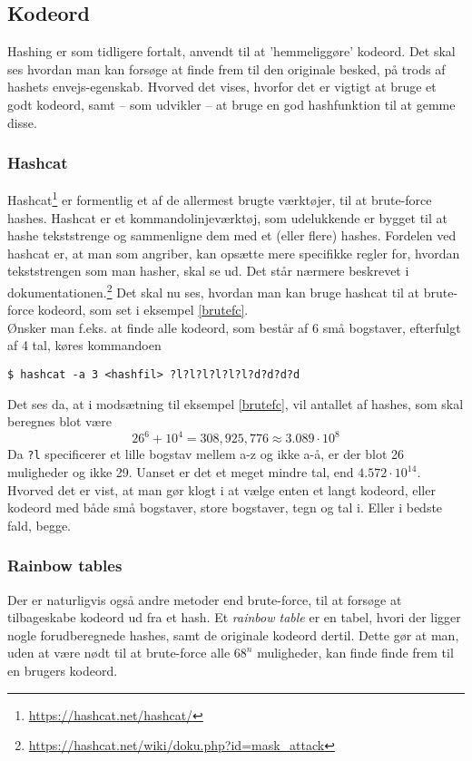 \subsection{Kodeord}\label{kodeord}
Hashing er som tidligere fortalt, anvendt til at 'hemmeliggøre' kodeord.
Det skal ses hvordan man kan forsøge at finde frem til den originale besked, på trods af hashets envejs-egenskab.
Hvorved det vises, hvorfor det er vigtigt at bruge et godt kodeord, samt -- som udvikler -- at bruge en god hashfunktion til at gemme disse.


    \subsubsection{Hashcat}
    Hashcat\footnote{\url{https://hashcat.net/hashcat/}} er formentlig et af de allermest brugte værktøjer, til at brute-force hashes.
    Hashcat er et kommandolinjeværktøj, som udelukkende er bygget til at hashe tekststrenge og sammenligne dem med et (eller flere) hashes.
    Fordelen ved hashcat er, at man som angriber, kan opsætte mere specifikke regler for, hvordan tekststrengen som man hasher, skal se ud.
    Det står nærmere beskrevet i dokumentationen.\footnote{\url{https://hashcat.net/wiki/doku.php?id=mask_attack}}
    Det skal nu ses, hvordan man kan bruge hashcat til at brute-force kodeord, som set i eksempel \ref{brutefc}.\\
    Ønsker man f.eks. at finde alle kodeord, som består af 6 små bogstaver, efterfulgt af 4 tal, køres kommandoen
    \begin{verbatim}
$ hashcat -a 3 <hashfil> ?l?l?l?l?l?l?d?d?d?d
    \end{verbatim}
    Det ses da, at i modsætning til eksempel \ref{brutefc}, vil antallet af hashes, som skal beregnes blot være
    \[26^6 + 10^4 = 308,925,776 \approx 3.089 \cdot 10^8\]
    Da \texttt{?l} specificerer et lille bogstav mellem a-z og ikke a-å, er der blot 26 muligheder og ikke 29.
    Uanset er det et meget mindre tal, end \(4.572 \cdot 10^{14}\). Hvorved det er vist, at man gør klogt i at vælge enten et langt kodeord, eller kodeord med både små bogstaver, store bogstaver, tegn og tal i. Eller i bedste fald, begge.

    \subsubsection{Rainbow tables}
    Der er naturligvis også andre metoder end brute-force, til at forsøge at tilbageskabe kodeord ud fra et hash.
    Et \emph{rainbow table} er en tabel, hvori der ligger nogle forudberegnede hashes, samt de originale kodeord dertil.\cite{rainbow}
    Dette gør at man, uden at være nødt til at brute-force alle \(68^n\) muligheder, kan finde finde frem til en brugers kodeord.


